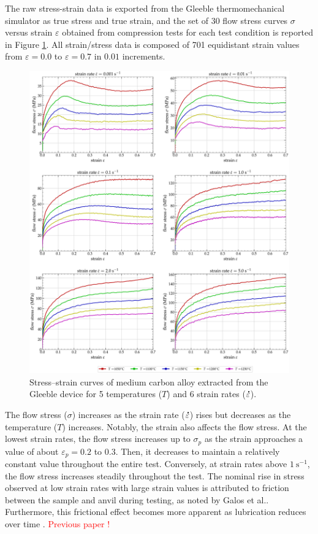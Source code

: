 \documentclass[metals,article,submit,pdftex,moreauthors]{Definitions/mdpi}
\makeatletter
\DeclareRobustCommand{\mdot}[1]{\accentset{\mbox{\bfseries .}}{#1}}
\DeclareRobustCommand{\eal}{et al.\@\xspace}
\DeclareRobustCommand{\ps}{\text{s}^{-1}}
\makeatother
\begin{document}
The raw stress-strain data is exported from the Gleeble thermomechanical simulator as true stress and true strain, and the set of 30 flow stress curves $\sigma$ versus strain $\varepsilon$ obtained from compression tests for each test condition is reported in Figure \ref{fig:RawData}.
All strain/stress data is composed of 701 equidistant strain values from $\varepsilon=0.0$ to $\varepsilon=0.7$ in $0.01$ increments.
\begin{figure}[H]
\centering
\includegraphics[width=0.9\columnwidth]{Figures/rawData}
\caption{Stress--strain curves of medium carbon alloy extracted from the Gleeble device for 5 temperatures ($T$) and 6 strain rates ($\mdot\varepsilon$).}
\label{fig:RawData}
\end{figure}

The flow stress ($\sigma$) increases as the strain rate ($\mdot\varepsilon$) rises but decreases as the temperature ($T$) increases.
Notably, the strain also affects the flow stress.
At the lowest strain rates, the flow stress increases up to $\sigma_p$ as the strain approaches a value of about $\varepsilon_p=0.2$ to $0.3$.
Then, it decreases to maintain a relatively constant value throughout the entire test.
Conversely, at strain rates above $1~\ps$, the flow stress increases steadily throughout the test.
The nominal rise in stress observed at low strain rates with large strain values is attributed to friction between the sample and anvil during testing, as noted by Galos \eal \cite{Galos-2022}.
Furthermore, this frictional effect becomes more apparent as lubrication reduces over time . \textcolor{red}{Previous paper !}
\end{document}
